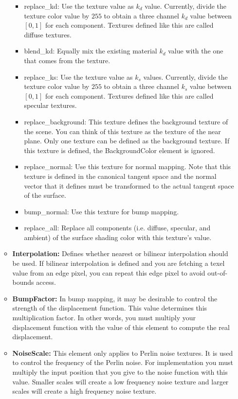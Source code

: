 \documentclass[12pt]{article}
\begin{document}
\begin{itemize}
\begin{itemize}
\begin{itemize}
\item replace\_kd: Use the texture value as $k_d$ value. Currently,
    divide the texture color value by $255$ to obtain a three channel
    $k_d$ value between $[0,1]$ for each component. Textures defined like this are called
    diffuse textures.
\item blend\_kd: Equally mix the existing material $k_d$ value with
the one that comes from the texture.
\item replace\_ks: Use the texture value as $k_s$ values. Currently,
    divide the texture color value by $255$ to obtain a three channel
    $k_s$ value between $[0,1]$ for each component. Textures defined like this are called
    specular textures.
\item replace\_background: This texture defines the background texture
    of the scene. You can think of this texture as the texture of the
    near plane. Only one texture can be defined as the background
    texture. If this texture is defined, the BackgroundColor element
    is ignored.
\item replace\_normal: Use this texture for normal mapping. Note that
    this texture is defined in the canonical tangent space and the
    normal vector that it defines must be transformed to the actual
    tangent space of the surface.
\item bump\_normal: Use this texture for bump mapping. 
\item replace\_all: Replace all components (i.e. diffuse, specular,
        and ambient) of the surface shading color with this texture's
     value.
\end{itemize}

\item \textbf{Interpolation:} Defines whether nearest or bilinear
interpolation should be used. If bilinear interpolation is defined
and you are fetching a texel value from an edge pixel, you can repeat
this edge pixel to avoid out-of-bounds access.

\item \textbf{BumpFactor:} In bump mapping, it may be desirable to
control the strength of the displacement function. This value
determines this multiplication factor. In other words, you must
multiply your displacement function with the value of this element to
compute the real displacement.

\item \textbf{NoiseScale:} This element only applies to Perlin noise
textures. It is used to control the frequency of the Perlin noise.
For implementation you must multiply the input position that you give
to the noise function with this value. Smaller scales will create a
low frequency noise texture and larger scales will create a high
frequency noise texture.


\end{itemize}
\end{itemize}
\end{document}
